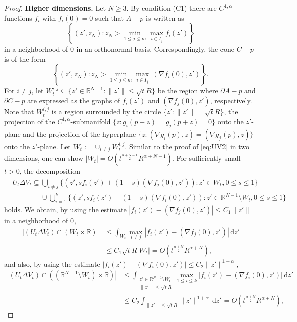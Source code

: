 \documentclass[graybox]{svmult}
\renewcommand{\d}{\mathrm{d}}  %
\newcommand{\R}{\mathbb{R}}  %
\renewcommand{\AA}{A}  %
\newcommand{\pp}{p}
\begin{document}
\begin{proof}
\vspace{2mm}
\noindent
\textbf{Higher dimensions.}  Let $N\ge3$. By condition (C1) there are $C^{1,\alpha}$-functions $f_i$ with $f_i(0)=0$ such that $\AA-p$ is  written as 
\[
\left\{(z', z_N): z_N > \min_{1\le j \le m} \max_{i \in I_j} f_i(z') \right\}
\] 
in a neighborhood of 0 in an orthonormal basis. Correspondingly, the cone $C-\pp$ is of the form 
\[
\left\{(z', z_N): z_N > \min_{1\le j \le m} \max_{i \in I_j}\, (\nabla f_i(0),z') \right\}. 
\] 
For $i\ne j$, let $W_t^{i,j}\subseteq  \{z' \in \R^{N-1}: \|z'\|\le \sqrt{t}R\}$ be the region where $\partial\AA-\pp$ and $\partial C-\pp$ are expressed as the graphs of $f_i(z')$ and $(\nabla f_j(0), z')$, respectively. Note that $W_t^{i,j}$  is a region surrounded by the circle $\{z': \|z'\|=\sqrt{t}R\}$, the projection of the $C^{1,\alpha}$-submanifold $\{z: g_i(\pp+z)=g_j(\pp+z)=0\}$  onto the $z'$-plane and the projection of  the hyperplane $\{z: (\nabla g_i(\pp),z)= (\nabla g_j(\pp),z)\}$ onto the $z'$-plane.   Let $W_t:= \cup_{i\ne j}W_t^{i,j}.$  Similar to the proof of \eqref{eq:UV2} in two dimensions, one can show $|W_t| = O(t^\frac{\alpha+N-1}{2}R^{\alpha+N-1})$.  For sufficiently small $t>0$, the decomposition   
\begin{align*}
&U_t\Delta V_t \subseteq  \bigcup_{i\ne j} \{(z',  s f_i(z') +(1-s) (\nabla f_j(0),z')): z' \in W_t, 0\le s \le 1\}  \\ 
&\quad\quad\qquad \cup \bigcup_{i=1}^k \{( z', s f_i(z') +(1-s) (\nabla f_i(0),z')): z' \in \R^{N-1}\setminus W_t, 0\le s \le 1 \} 
\end{align*}
holds.  We obtain, by using the estimate $|f_i(z') - (\nabla f_j(0),z')| \le C_1\|z'\|$ in a neighborhood of $0$, 
\begin{align*}
|(U_t\Delta V_t)\cap (W_t \times \R )| 
&\le  \int_{W_t}\max_{i\ne j} | f_i(z') - (\nabla f_j(0),z') |\,\d z' \\
&\le C_1\sqrt{t}R|W_t|=  O(t^\frac{\alpha+N}{2}R^{\alpha+N}), 
\end{align*}
and also, by using the estimate $|f_i(z') -(\nabla f_i(0), z') | \le C_2 \|z'\|^{1+\alpha}$, 
\begin{align*}
|(U_t\Delta V_t)\cap ( (\R^{N-1}\setminus W_t)\times \R)| 
&\le  \int_{\substack{z'\in \R^{N-1}\setminus W_t\\ \|z'\|\le \sqrt{t}R}} 
\max_{1 \le i \le k}|f_i(z') -(\nabla f_i(0), z')|\,\d z' \\
&\le  C_2\int_{\|z'\|\le \sqrt{t}R}
\|z'\|^{1+\alpha}\,\d z' = O(t^\frac{\alpha+N}{2}R^{\alpha+N}), 
\end{align*}

\end{proof}
\end{document}
